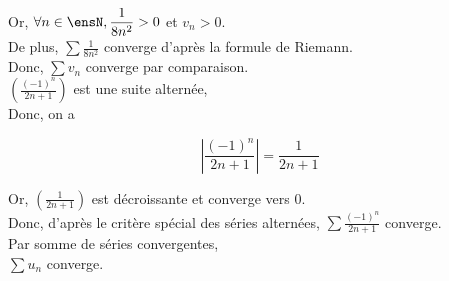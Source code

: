 \begin{enumerate}
{        Or, $\displaystyle \forall n \in \ensN, \frac{1}{8n^2} > 0$ et $v_n > 0$. \\
        De plus, $\displaystyle \sum \frac{1}{8n^2}$ converge d'après la formule de Riemann. \\
        Donc, $\sum v_n$ converge par comparaison. \\

        $(\frac{(-1)^n}{2n + 1})$ est une suite alternée, \\
        Donc, on a

        $$
            | \frac{(-1)^n}{2n + 1} | = \frac{1}{2n + 1}
        $$

        Or, $\displaystyle (\frac{1}{2n + 1})$ est décroissante et converge vers 0. \\
        Donc, d'après le critère spécial des séries alternées, $\displaystyle \sum \frac{(-1)^n}{2n + 1}$ converge. \\

        Par somme de séries convergentes, \\
        $\sum u_n$ converge.
    }
\end{enumerate}